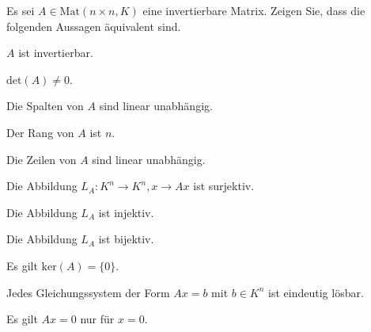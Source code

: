 \begin{Problem}
	Es sei $A\in \text{Mat}(n\times n, K)$ eine invertierbare Matrix. Zeigen Sie, dass die folgenden Aussagen äquivalent sind.
	\begin{parts}
		\item $A$ ist invertierbar.
		\item $\text{det}(A)\neq 0$.
		\item Die Spalten von $A$ sind linear unabhängig.
		\item Der Rang von $A$ ist $n$.
		\item Die Zeilen von $A$ sind linear unabhängig.
		\item Die Abbildung $L_A:K^n\to K^n,x\to Ax$ ist surjektiv.
		\item Die Abbildung  $L_A$ ist injektiv.
		\item Die Abbildung $L_A$ ist bijektiv.
		\item Es gilt $\text{ker}(A)=\{0\} $.
		\item Jedes Gleichungssystem der Form $Ax=b$ mit $b\in K^n$ ist eindeutig lösbar.
		\item Es gilt $Ax=0$ nur f\"{u}r $x=0$.
	\end{parts}
\end{Problem}

